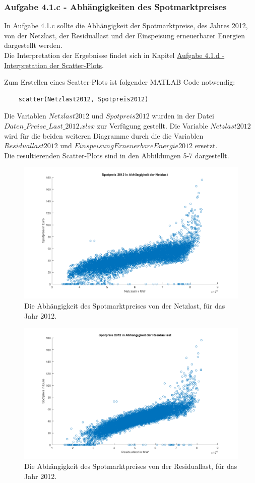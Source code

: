 \documentclass[a4paper,12pt]{article}
\begin{document}
	\subsubsection{Aufgabe 4.1.c - Abhängigkeiten des Spotmarktpreises}
	In Aufgabe 4.1.c sollte die Abhängigkeit der Spotmarktpreise, des Jahres 2012, von der Netzlast, der Residuallast und der Einspeisung erneuerbarer Energien dargestellt werden.\\
	Die Interpretation der Ergebnisse findet sich in Kapitel \hyperref[sec:Ergebnisse41d]{Aufgabe 4.1.d - Interpretation der Scatter-Plots}.\\ \par
	\noindent Zum Erstellen eines Scatter-Plots ist folgender MATLAB Code notwendig:
	\begin{lstlisting}
	scatter(Netzlast2012, Spotpreis2012)
	\end{lstlisting}
	Die Variablen $Netzlast2012$ und $Spotpreis2012$ wurden in der Datei $Daten\_Preise\_Last\_2012.xlsx$ zur Verfügung gestellt. Die Variable $Netzlast2012$ wird für die beiden weiteren Diagramme durch die die Variablen $Residuallast2012$ und $EinspeisungErneuerbareEnergie2012$ ersetzt.\\
	Die resultierenden Scatter-Plots sind in den Abbildungen 5-7 dargestellt.
	\begin{figure}[H]
		\centering
		\includegraphics[width=12cm]{img/results/ScatterNetzlast}
		\caption{Die Abhängigkeit des Spotmarktpreises von der Netzlast, für das Jahr 2012.}
	\end{figure}
	\begin{figure}[H]
		\centering
		\includegraphics[width=12cm]{img/results/ScatterResiduallast}
		\caption{Die Abhängigkeit des Spotmarktpreises von der Residuallast, für das Jahr 2012.}
	\end{figure}
\end{document}
